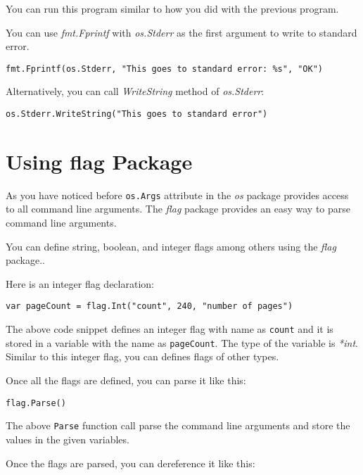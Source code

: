 You can run this program similar to how you did with the previous program.

You can use \textit{fmt.Fprintf} with \textit{os.Stderr} as the first argument
to write to standard error.

\begin{lstlisting}[numbers=none]
fmt.Fprintf(os.Stderr, "This goes to standard error: %s", "OK")
\end{lstlisting}

Alternatively, you can call \textit{WriteString} method of \textit{os.Stderr}:

\begin{lstlisting}[numbers=none]
os.Stderr.WriteString("This goes to standard error")
\end{lstlisting}

\section{Using flag Package}

As you have noticed before \texttt{os.Args} attribute in the \textit{os} package
provides access to all command line arguments.
The \textit{flag} package provides an easy way to parse
command line arguments.

You can define string, boolean, and integer flags among others using
the \textit{flag} package..

Here is an integer flag declaration:

\begin{lstlisting}[numbers=none]
var pageCount = flag.Int("count", 240, "number of pages")
\end{lstlisting}

The above code snippet defines an integer flag with name
as \texttt{count} and it is stored in a variable with the name
as \texttt{pageCount}.  The type of the variable is \textit{*int}.
Similar to this integer flag, you can defines flags of other types.

Once all the flags are defined, you can parse it like this:

\begin{lstlisting}[numbers=none]
flag.Parse()
\end{lstlisting}

The above \texttt{Parse} function call parse the command line
arguments and store the values in the given variables.

Once the flags are parsed, you can dereference it like this:

